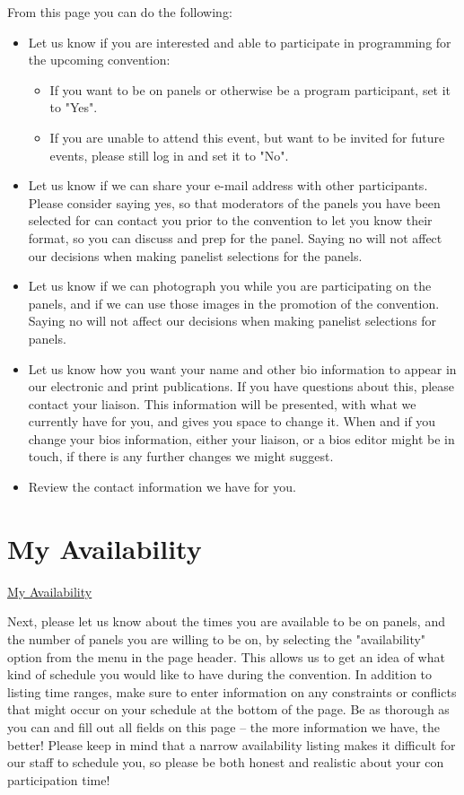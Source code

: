 \documentclass[captions=tablesignature]{scrartcl}
\begin{document}
From this page you can do the following:
\begin{itemize}
\item Let us know if you are interested and able to participate in
programming for the upcoming convention:
\begin{itemize}
\item If you want to be on panels or otherwise be a program
participant, set it to "Yes".
\item If you are unable to attend this event, but want to be invited
for future events, please still log in and set it to "No".
\end{itemize}
\item Let us know if we can share your e-mail address with other
participants.  Please consider saying yes, so that moderators of
the panels you have been selected for can contact you prior to the
convention to let you know their format, so you can discuss and
prep for the panel.  Saying no will not affect our decisions when
making panelist selections for the panels.
\item Let us know if we can photograph you while you are participating
on the panels, and if we can use those images in the promotion of
the convention.  Saying no will not affect our decisions when
making panelist selections for panels.
\item Let us know how you want your name and other bio information to
appear in our electronic and print publications.  If you have
questions about this, please contact your liaison.  This
information will be presented, with what we currently have for
you, and gives you space to change it.  When and if you change
your bios information, either your liaison, or a bios editor might
be in touch, if there is any further changes we might suggest.
\item Review the contact information we have for you.
\end{itemize}

\section{My Availability}
\label{sec-4}
\label{my_sched_constr.php}
\underline{
\href{../webpages/my_sched_constr.php}{My Availability}
}

Next, please let us know about the times you are available to be on
panels, and the number of panels you are willing to be on, by
selecting the "availability" option from the menu in the page
header. This allows us to get an idea of what kind of schedule you
would like to have during the convention. In addition to listing
time ranges, make sure to enter information on any constraints or
conflicts that might occur on your schedule at the bottom of the
page. Be as thorough as you can and fill out all fields on this page
-- the more information we have, the better! Please keep in mind
that a narrow availability listing makes it difficult for our staff
to schedule you, so please be both honest and realistic about your
con participation time!
\end{document}
